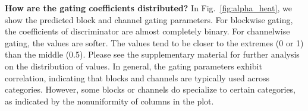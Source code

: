 \vspace{2mm} \noindent \textbf{How are the gating coefficients distributed?} In Fig.~\ref{fig:alpha_heat}, we show the predicted block and channel gating parameters. For blockwise gating, the coefficients of discriminator are almost completely binary. For channelwise gating, the values are softer. The values tend to be closer to the extremes (0 or 1) than the middle (0.5). Please see the supplementary material for further analysis on the distribution of values. In general, the gating parameters exhibit correlation, indicating that blocks and channels are typically used across categories. However, some blocks or channels do specialize to certain categories, as indicated by the nonuniformity of columns in the plot.








